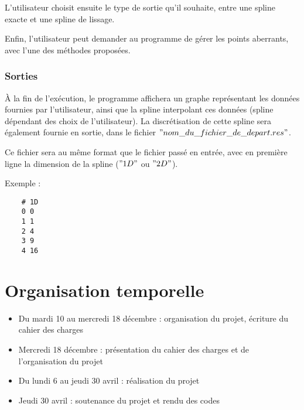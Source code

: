 \documentclass[a4paper,12pt]{article}
\begin{document}
L'utilisateur choisit ensuite le type de sortie qu'il souhaite, entre une spline exacte et une spline de lissage.

Enfin, l'utilisateur peut demander au programme de gérer les points aberrants, avec l'une des méthodes proposées.

\newpage
\subsubsection{Sorties}

À la fin de l'exécution, le programme affichera un graphe représentant les données fournies par l'utilisateur, ainsi que la spline interpolant ces données (spline dépendant des choix de l'utilisateur). La discrétisation de cette spline sera également fournie en sortie, dans le fichier $"nom\_du\_fichier\_de\_depart.res"$.

Ce fichier sera au même format que le fichier passé en entrée, avec en première ligne la dimension de la spline ($"1D" $ ou $"2D"$).

Exemple : 

\begin{lstlisting}
    # 1D
    0 0
    1 1
    2 4
    3 9
    4 16
\end{lstlisting}

\section{Organisation temporelle}
\begin{itemize}
\item Du mardi 10 au mercredi 18 décembre : organisation du projet, écriture du cahier des charges
\item Mercredi 18 décembre : présentation du cahier des charges et de l'organisation du projet
\item Du lundi 6 au jeudi 30 avril : réalisation du projet
\item Jeudi 30 avril : soutenance du projet et rendu des codes
\end{itemize}
\end{document}
